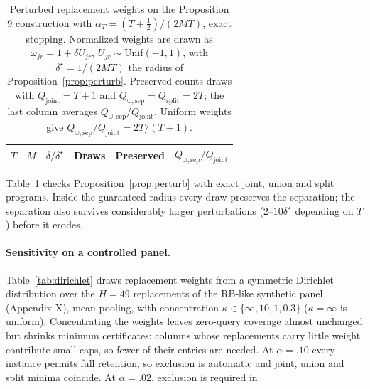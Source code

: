 \documentclass[11pt]{article}
\newcommand{\Qj}{Q_{\mathrm{joint}}}
\newcommand{\Qu}{Q_{\cup,\mathrm{sep}}}
\newcommand{\Qs}{Q_{\mathrm{split}}}
\begin{document}
\begin{table}[t]
\centering\small
\begin{tabular}{@{}rrrrrr@{}}
\toprule
$T$ & $M$ & $\delta/\delta^\star$ & Draws & Preserved & $\overline{\Qu/\Qj}$\\
\midrule
\bottomrule
\end{tabular}
\caption{Perturbed replacement weights on the Proposition 9 construction with $\alpha_T=(T+\frac12)/(2MT)$, exact stopping. Normalized weights are drawn as $\omega_{jr}=1+\delta U_{jr}$, $U_{jr}\sim\mathrm{Unif}(-1,1)$, with $\delta^\star=1/(2MT)$ the radius of Proposition~\ref{prop:perturb}. Preserved counts draws with $\Qj=T+1$ and $\Qu=\Qs=2T$; the last column averages $\Qu/\Qj$. Uniform weights give $\Qu/\Qj=2T/(T+1)$.}
\label{tab:perturb}
\end{table}

Table~\ref{tab:perturb} checks Proposition~\ref{prop:perturb} with exact joint, union and split programs. Inside the guaranteed radius every draw preserves the separation; the separation also survives considerably larger perturbations ($2$--$10\delta^\star$ depending on $T$) before it erodes.

\paragraph{Sensitivity on a controlled panel.} Table~\ref{tab:dirichlet} draws replacement weights from a symmetric Dirichlet distribution over the $H=49$ replacements of the RB-like synthetic panel (Appendix X), mean pooling, with concentration $\kappa\in\{\infty,10,1,0.3\}$ ($\kappa=\infty$ is uniform). Concentrating the weights leaves zero-query coverage almost unchanged but shrinks minimum certificates: columns whose replacements carry little weight contribute small caps, so fewer of their entries are needed. At $\alpha=.10$ every instance permits full retention, so exclusion is automatic and joint, union and split minima coincide. At $\alpha=.02$, exclusion is required in %
\end{document}
